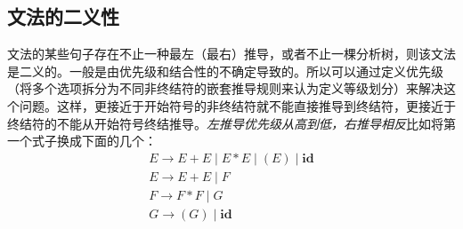 \documentclass[]{report}
\begin{document}
		\subsection{文法的二义性}
		文法的某些句子存在不止一种最左（最右）推导，或者不止一棵分析树，则该文法是二义的。一般是由优先级和结合性的不确定导致的。所以可以通过定义优先级（将多个选项拆分为不同非终结符的嵌套推导规则来认为定义等级划分）来解决这个问题。这样，更接近于开始符号的非终结符就不能直接推导到终结符，更接近于终结符的不能从开始符号终结推导。\textit{左推导优先级从高到低，右推导相反}比如将第一个式子换成下面的几个：
		\[\begin{gathered}
			E\to E+E\mid E*E\mid(E)\mid\mathbf{id}\\
			E\to E+E\mid F\\
			F\to F*F\mid G\\
			G\to (G)\mid\mathbf{id}
		\end{gathered}\]
\end{document}
